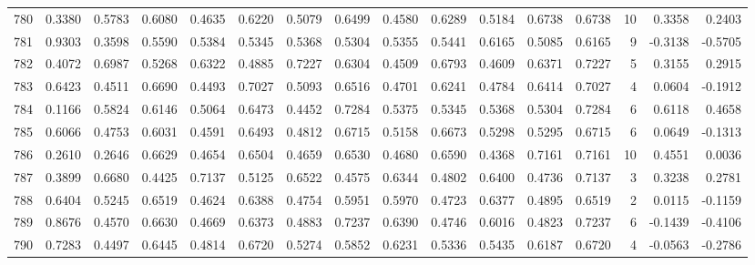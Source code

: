 \begin{tabular}{lrrrrrrrrrrrrrrr}
780 &      0.3380 &  0.5783 &  0.6080 &  0.4635 &  0.6220 &  0.5079 &  0.6499 &  0.4580 &  0.6289 &  0.5184 &   0.6738 &     0.6738 &     10 &                    0.3358 &                     0.2403 \\
781 &      0.9303 &  0.3598 &  0.5590 &  0.5384 &  0.5345 &  0.5368 &  0.5304 &  0.5355 &  0.5441 &  0.6165 &   0.5085 &     0.6165 &      9 &                   -0.3138 &                    -0.5705 \\
782 &      0.4072 &  0.6987 &  0.5268 &  0.6322 &  0.4885 &  0.7227 &  0.6304 &  0.4509 &  0.6793 &  0.4609 &   0.6371 &     0.7227 &      5 &                    0.3155 &                     0.2915 \\
783 &      0.6423 &  0.4511 &  0.6690 &  0.4493 &  0.7027 &  0.5093 &  0.6516 &  0.4701 &  0.6241 &  0.4784 &   0.6414 &     0.7027 &      4 &                    0.0604 &                    -0.1912 \\
784 &      0.1166 &  0.5824 &  0.6146 &  0.5064 &  0.6473 &  0.4452 &  0.7284 &  0.5375 &  0.5345 &  0.5368 &   0.5304 &     0.7284 &      6 &                    0.6118 &                     0.4658 \\
785 &      0.6066 &  0.4753 &  0.6031 &  0.4591 &  0.6493 &  0.4812 &  0.6715 &  0.5158 &  0.6673 &  0.5298 &   0.5295 &     0.6715 &      6 &                    0.0649 &                    -0.1313 \\
786 &      0.2610 &  0.2646 &  0.6629 &  0.4654 &  0.6504 &  0.4659 &  0.6530 &  0.4680 &  0.6590 &  0.4368 &   0.7161 &     0.7161 &     10 &                    0.4551 &                     0.0036 \\
787 &      0.3899 &  0.6680 &  0.4425 &  0.7137 &  0.5125 &  0.6522 &  0.4575 &  0.6344 &  0.4802 &  0.6400 &   0.4736 &     0.7137 &      3 &                    0.3238 &                     0.2781 \\
788 &      0.6404 &  0.5245 &  0.6519 &  0.4624 &  0.6388 &  0.4754 &  0.5951 &  0.5970 &  0.4723 &  0.6377 &   0.4895 &     0.6519 &      2 &                    0.0115 &                    -0.1159 \\
789 &      0.8676 &  0.4570 &  0.6630 &  0.4669 &  0.6373 &  0.4883 &  0.7237 &  0.6390 &  0.4746 &  0.6016 &   0.4823 &     0.7237 &      6 &                   -0.1439 &                    -0.4106 \\
790 &      0.7283 &  0.4497 &  0.6445 &  0.4814 &  0.6720 &  0.5274 &  0.5852 &  0.6231 &  0.5336 &  0.5435 &   0.6187 &     0.6720 &      4 &                   -0.0563 &                    -0.2786 \\

\end{tabular}
